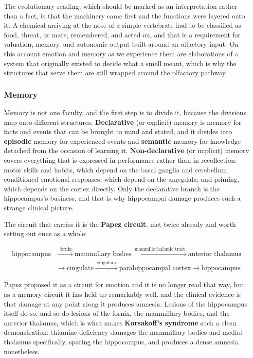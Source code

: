 \documentclass[11pt]{article}
\begin{document}
The evolutionary reading, which should be marked as an interpretation rather than a fact, is that the machinery came first and the functions were layered onto it. A chemical arriving at the nose of a simple vertebrate had to be classified as food, threat, or mate, remembered, and acted on, and that is a requirement for valuation, memory, and autonomic output built around an olfactory input. On this account emotion and memory as we experience them are elaborations of a system that originally existed to decide what a smell meant, which is why the structures that serve them are still wrapped around the olfactory pathway.

\subsubsection{Memory}

Memory is not one faculty, and the first step is to divide it, because the divisions map onto different structures. \textbf{Declarative} (or explicit) memory is memory for facts and events that can be brought to mind and stated, and it divides into \textbf{episodic} memory for experienced events and \textbf{semantic} memory for knowledge detached from the occasion of learning it. \textbf{Non-declarative} (or implicit) memory covers everything that is expressed in performance rather than in recollection: motor skills and habits, which depend on the basal ganglia and cerebellum; conditioned emotional responses, which depend on the amygdala; and priming, which depends on the cortex directly. Only the declarative branch is the hippocampus's business, and that is why hippocampal damage produces such a strange clinical picture.

The circuit that carries it is the \textbf{Papez circuit}, met twice already and worth setting out once as a whole:

\begin{align*}
\text{hippocampus} &\xrightarrow{\;\text{fornix}\;} \text{mammillary bodies} \xrightarrow{\;\text{mammillothalamic tract}\;} \text{anterior thalamus} \\
&\rightarrow \text{cingulate} \xrightarrow{\;\text{cingulum}\;} \text{parahippocampal cortex} \rightarrow \text{hippocampus}
\end{align*}

Papez proposed it as a circuit for emotion and it is no longer read that way, but as a memory circuit it has held up remarkably well, and the clinical evidence is that damage at any point along it produces amnesia. Lesions of the hippocampus itself do so, and so do lesions of the fornix, the mammillary bodies, and the anterior thalamus, which is what makes \textbf{Korsakoff's syndrome} such a clean demonstration: thiamine deficiency damages the mammillary bodies and medial thalamus specifically, sparing the hippocampus, and produces a dense amnesia nonetheless.
\end{document}
